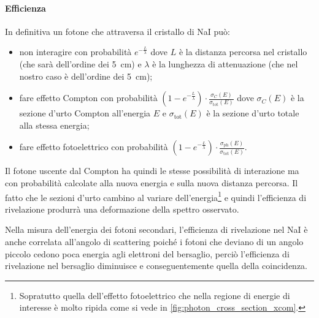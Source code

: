  \paragraph{Efficienza}
 In definitiva un fotone che attraversa il cristallo di NaI può: 
 \begin{itemize}
 	\item non interagire con probabilità $e^{-\frac{L}{\lambda}}$ dove $L$ è la distanza percorsa nel cristallo (che sarà dell'ordine dei \SI{5}{cm}) e $\lambda$ è la lunghezza di attenuazione (che nel nostro caso è dell'ordine dei \SI{5}{cm});
 	\item fare effetto Compton con probabilità $(1-e^{-\frac{L}{\lambda}})\cdot \frac{\sigma_{C}(E)}{\sigma_\text{tot}(E)}$ dove $\sigma_{C}(E)$ è la sezione d'urto Compton all'energia $E$ e $\sigma_\text{tot}(E)$ è la sezione d'urto totale alla stessa energia;
 	\item fare effetto fotoelettrico con probabilità $(1-e^{-\frac{L}{\lambda}})\cdot \frac{\sigma_\text{ph}(E)}{\sigma_\text{tot}(E)}$.
 \end{itemize}
 Il fotone uscente dal Compton ha quindi le stesse possibilità di interazione ma con probabilità calcolate alla nuova energia e sulla nuova distanza percorsa.
 Il fatto che le sezioni d'urto cambino al variare dell'energia\footnote{Sopratutto quella dell'effetto fotoelettrico che nella regione di energie di interesse è molto ripida come si vede in \autoref{fig:photon_cross_section_xcom}.} e quindi l'efficienza di rivelazione produrrà una deformazione della spettro osservato.
 
 
 Nella misura dell'energia dei fotoni secondari, l'efficienza di rivelazione nel NaI è anche correlata all'angolo di scattering poiché i fotoni che deviano di un angolo piccolo cedono poca energia agli elettroni del bersaglio, perciò l'efficienza di rivelazione nel bersaglio diminuisce e conseguentemente quella della coincidenza.
 
